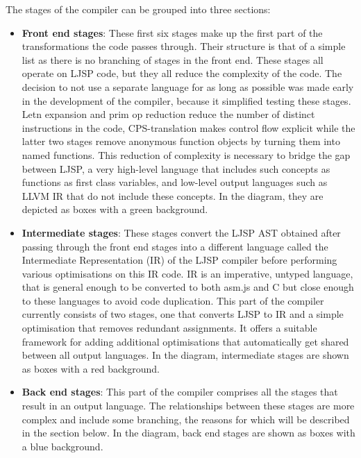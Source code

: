 \documentclass[11pt]{report}
\begin{document}
The stages of the compiler can be grouped into three sections:
\begin{itemize}
\item \textbf{Front end stages}: These first six stages make up the first part of the transformations the code passes through. Their structure is that of a simple list as there is no branching of stages in the front end. These stages all operate on LJSP code, but they all reduce the complexity of the code. The decision to not use a separate language for as long as possible was made early in the development of the compiler, because it simplified testing these stages. Letn expansion and prim op reduction reduce the number of distinct instructions in the code, CPS-translation makes control flow explicit while the latter two stages remove anonymous function objects by turning them into named functions. This reduction of complexity is necessary to bridge the gap between LJSP, a very high-level language that includes such concepts as functions as first class variables, and low-level output languages such as LLVM IR that do not include these concepts. In the diagram, they are depicted as boxes with a green background.

\item \textbf{Intermediate stages}: These stages convert the LJSP AST obtained after passing through the front end stages into a different language called the Intermediate Representation (IR) of the LJSP compiler before performing various optimisations on this IR code. IR is an imperative, untyped language, that is general enough to be converted to both asm.js and C but close enough to these languages to avoid code duplication. This part of the compiler currently consists of two stages, one that converts LJSP to IR and a simple optimisation that removes redundant assignments. It offers a suitable framework for adding additional optimisations that automatically get shared between all output languages. In the diagram, intermediate stages are shown as boxes with a red background.

\item \textbf{Back end stages}: This part of the compiler comprises all the stages that result in an output language. The relationships between these stages are more complex and include some branching, the reasons for which will be described in the section below. In the diagram, back end stages are shown as boxes with a blue background.
\end{itemize}
\end{document}
